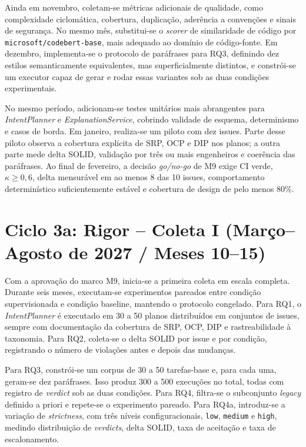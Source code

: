 \documentclass[12pt,a4paper]{article}
\begin{document}
Ainda em novembro, coletam-se métricas adicionais de qualidade, como complexidade ciclomática, cobertura, duplicação, aderência a convenções e sinais de segurança. No mesmo mês, substitui-se o \textit{scorer} de similaridade de código por \texttt{microsoft/codebert-base}, mais adequado ao domínio de código-fonte. Em dezembro, implementa-se o protocolo de paráfrases para RQ3, definindo dez estilos semanticamente equivalentes, mas superficialmente distintos, e constrói-se um executor capaz de gerar e rodar essas variantes sob as duas condições experimentais.

No mesmo período, adicionam-se testes unitários mais abrangentes para \textit{IntentPlanner} e \textit{ExplanationService}, cobrindo validade de esquema, determinismo e casos de borda. Em janeiro, realiza-se um piloto com dez issues. Parte desse piloto observa a cobertura explícita de SRP, OCP e DIP nos planos; a outra parte mede delta SOLID, validação por três ou mais engenheiros e coerência das paráfrases. Ao final de fevereiro, a decisão \textit{go/no-go} de M9 exige CI verde, $\kappa \geq 0{,}6$, delta mensurável em ao menos 8 das 10 issues, comportamento determinístico suficientemente estável e cobertura de design de pelo menos 80\%.

\section*{Ciclo 3a: Rigor -- Coleta I (Março--Agosto de 2027 / Meses 10--15)}

Com a aprovação do marco M9, inicia-se a primeira coleta em escala completa. Durante seis meses, executam-se experimentos pareados entre condição supervisionada e condição baseline, mantendo o protocolo congelado. Para RQ1, o \textit{IntentPlanner} é executado em 30 a 50 planos distribuídos em conjuntos de issues, sempre com documentação da cobertura de SRP, OCP, DIP e rastreabilidade à taxonomia. Para RQ2, coleta-se o delta SOLID por issue e por condição, registrando o número de violações antes e depois das mudanças.

Para RQ3, constrói-se um corpus de 30 a 50 tarefas-base e, para cada uma, geram-se dez paráfrases. Isso produz 300 a 500 execuções no total, todas com registro de \textit{verdict} sob as duas condições. Para RQ4, filtra-se o subconjunto \textit{legacy} definido a priori e repete-se o experimento pareado. Para RQ4a, introduz-se a variação de \textit{strictness}, com três níveis configuracionais, \texttt{low}, \texttt{medium} e \texttt{high}, medindo distribuição de \textit{verdicts}, delta SOLID, taxa de aceitação e taxa de escalonamento.
\end{document}
